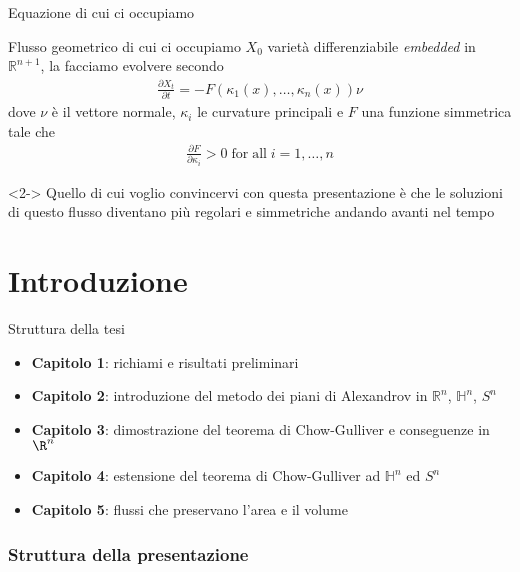 \begin{frame}{Equazione di cui ci occupiamo}{}
	\begin{block}{Flusso geometrico di cui ci occupiamo}
		$X_0$ varietà differenziabile \textit{embedded} in $\mathbb{R}^{n+1}$, la facciamo evolvere secondo
		\begin{align*}
				\frac{\partial X_t}{\partial t} = - F(\kappa_1(x), \dots , \kappa_n(x)) \nu
		\end{align*}
		dove $\nu$ è il vettore normale, $\kappa_i$ le curvature principali e $F$ una funzione simmetrica tale che 
		\begin{align*}
			\frac{\partial F}{\partial \kappa_i} > 0 \mathrm{\; for \; all } \; i=1,\dots, n
		\end{align*}
		
	\end{block}
	\begin{block}{}<2->
		Quello di cui voglio convincervi con questa presentazione è che le soluzioni di questo flusso diventano più regolari e simmetriche andando avanti nel tempo
	\end{block}
\end{frame}


\section{Introduzione}

\begin{frame}{Struttura della tesi}{}

\begin{itemize}
	\item \textbf{Capitolo 1}: richiami e risultati preliminari 
	\item \textbf{Capitolo 2}: introduzione del metodo dei piani di Alexandrov in $\mathbb{R}^n$, $\mathbb{H}^n$, $S^n$
	\item \textbf{Capitolo 3}: dimostrazione del teorema di Chow-Gulliver e conseguenze in $\R^n$
	\item \textbf{Capitolo 4}: estensione del teorema di Chow-Gulliver ad $\mathbb{H}^n$ ed $S^n$ 
	\item \textbf{Capitolo 5}: flussi che preservano l'area e il volume
\end{itemize}
\end{frame}


\begin{frame}
	\frametitle{Struttura della presentazione}
	\tableofcontents
\end{frame}

